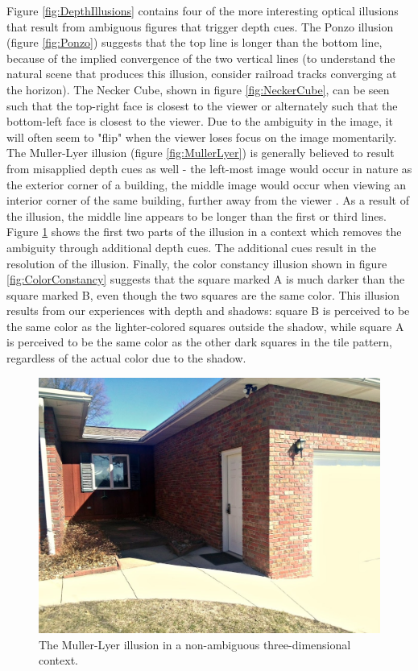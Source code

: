 \documentclass[11pt]{isuthesis}\usepackage[]{graphicx}\usepackage[]{color}
\begin{document}
Figure \ref{fig:DepthIllusions} contains four of the more interesting optical illusions that result from ambiguous figures that trigger depth cues. The Ponzo illusion (figure \ref{fig:Ponzo}) suggests that the top line is longer than the bottom line, because of the implied convergence of the two vertical lines (to understand the natural scene that produces this illusion, consider railroad tracks converging at the horizon). The Necker Cube, shown in figure \ref{fig:NeckerCube}, can be seen such that the top-right face is closest to the viewer or alternately such that the bottom-left face is closest to the viewer. Due to the ambiguity in the image, it will often seem to "flip" when the viewer loses focus on the image momentarily\citep{gregory1997knowledge}. The Muller-Lyer illusion (figure \ref{fig:MullerLyer}) is generally believed to result from misapplied depth cues as well - the left-most image would occur in nature as the exterior corner of a building, the middle image would occur when viewing an interior corner of the same building, further away from the viewer \citep{ward1977case, gregory1968perceptual, fisher1970experimental}. As a result of the illusion, the middle line appears to be longer than the first or third lines. Figure \ref{fig:mullerlyerhouse} shows the first two parts of the illusion in a context which removes the ambiguity through additional depth cues. The additional cues result in the resolution of the illusion. Finally, the color constancy illusion shown in figure \ref{fig:ColorConstancy} suggests that the square marked A is much darker than the square marked B, even though the two squares are the same color. This illusion results from our experiences with depth and shadows: square B is perceived to be the same color as the lighter-colored squares outside the shadow, while square A is perceived to be the same color as the other dark squares in the tile pattern, regardless of the actual color due to the shadow. 

\begin{figure}[htbp]\centering
\includegraphics[width=.5\textwidth]{mullerlyerhouse}
\caption[Muller Lyer Real World Context]{The Muller-Lyer illusion in a non-ambiguous three-dimensional context.}\label{fig:mullerlyerhouse}
\end{figure}
\end{document}

